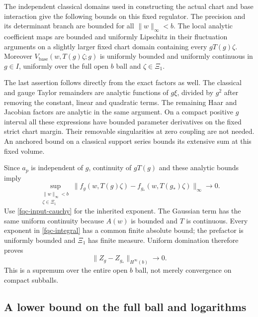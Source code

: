 The independent classical domains used in constructing the actual
chart and base interaction give the following bounds on this
fixed regulator. The precision and its determinant branch are
bounded for all $\lVert w\rVert_\infty<b$. The local analytic
coefficient maps are bounded and uniformly Lipschitz in their
fluctuation arguments on a slightly larger fixed chart domain
containing every $gT(g)\zeta$. Moreover
$V_{\mathrm{base}}(w,T(g)\zeta;g)$ is uniformly bounded and
uniformly continuous in $g\in I$, uniformly over the full open
$b$ ball and $\zeta\in\Xi_1$.

The last assertion follows directly from the exact factors as
well. The classical and gauge Taylor remainders are analytic
functions of $g\xi$, divided by $g^2$ after removing the constant,
linear and quadratic terms. The remaining Haar and Jacobian
factors are analytic in the same argument. On a compact positive
$g$ interval all these expressions have bounded parameter
derivatives on the fixed strict chart margin. Their removable
singularities at zero coupling are not needed. An anchored bound
on a classical support series bounds its extensive sum at this
fixed volume.

Since $a_p$ is independent of $g$, continuity of $gT(g)$ and these
analytic bounds imply
\begin{equation}
 \sup_{\substack{\lVert w\rVert_\infty<b\\\zeta\in\Xi_1}}
 \bigl\lVert f_g(w,T(g)\zeta)
       -f_{g_*}(w,T(g_*)\zeta)\bigr\rVert_\infty
       \longrightarrow0.
 \label{fqc-field-continuity}
\end{equation}
Use \eqref{fqc-input-cauchy} for the inherited exponent. The
Gaussian term has the same uniform continuity because $A(w)$
is bounded and $T$ is continuous. Every exponent in
\eqref{fqc-integral} has a common finite absolute bound; the
prefactor is uniformly bounded and $\Xi_1$ has finite measure.
Uniform domination therefore proves
\begin{equation}
 \lVert Z_g-Z_{g_*}\rVert_{H^\infty(b)}
       \longrightarrow0 .
 \label{fqc-z-continuity}
\end{equation}
This is a supremum over the entire open $b$ ball, not merely
convergence on compact subballs.

\subsection{A lower bound on the full ball and logarithms}
\label{fqc-log-section}

